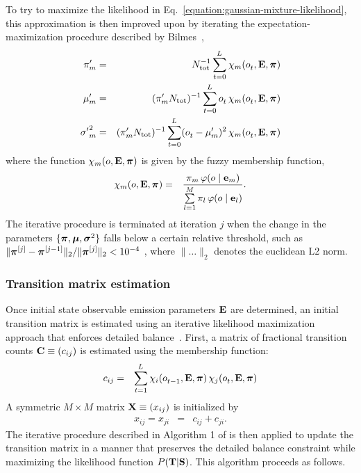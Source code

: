 \documentclass[aps,pre,twocolumn,superscriptaddress,nofootinbib,longbibliography]{revtex4-1}
\newcommand{\bfv}[1]{{\mbox{\boldmath{$#1$}}}}
\newcommand{\bfm}[1]{{\bf #1}}
\begin{document}
{{\color{red} To try to maximize the likelihood in Eq.~\ref{equation:gaussian-mixture-likelihood}, this} approximation is then improved upon by iterating the expectation-maximization procedure described by Bilmes~\cite{bilmes:1998:expectation-maximization},
\begin{eqnarray}
\pi'_m &=& N_\mathrm{tot}^{-1} \sum_{t=0}^{L^{}} \chi_m(o^{}_t, \bfm{E}, \bfv{\pi}) \nonumber \\
\mu'_m &=& (\pi'_m N_\mathrm{tot})^{-1} \sum\limits_{t=0}^{L^{}} o^{}_{t} \, \chi_m(o^{}_{t}, \bfm{E}, \bfv{\pi}) \nonumber \\
{\sigma'}^2_m &=& (\pi'_m N_\mathrm{tot})^{-1} \sum\limits_{t=0}^{L^{}} (o^{}_{t} - \mu'_m)^2 \, \chi_m(o^{}_{t}, \bfm{E}, \bfv{\pi}) 
\end{eqnarray}
where the function $\chi_m(o, \bfm{E}, \bfv{\pi})$ is given by the fuzzy membership function,
\begin{eqnarray}
\chi_m(o, \bfm{E}, \bfv{\pi}) &=& \frac{\pi_m \, \varphi(o \mid \bfm{e}_m)}{\sum\limits_{l=1}^M \pi_l \, \varphi(o \mid \bfm{e}_l)} .
\end{eqnarray}
The iterative procedure is terminated at iteration $j$ when the change in the parameters $\{\bfv{\pi}, \bfv{\mu}, \bfv{\sigma}^2\}$ falls below a certain relative threshold, such as $\|\bfv{\pi}^{[j]} - \bfv{\pi}^{[j-1]}\|_2 / \|\bfv{\pi}^{[j]}\|_2 < 10^{-4}$ {\color{red}, where $\| \ldots \|_2$ denotes the euclidean L2 norm}.

\subsubsection{Transition matrix estimation}

Once initial state observable emission parameters $\bfm{E}$ are determined, an initial transition matrix is estimated using an iterative likelihood maximization approach that enforces detailed balance~\cite{noe:jcp:2011:msm-review}.
First, a matrix of fractional transition counts $\bfm{C} \equiv (c_{ij})$ is estimated using the membership function:
\begin{eqnarray}
c_{ij} &=& \sum_{t=1}^{L^{}} \chi_i(o^{}_{t-1}, \bfm{E}, \bfv{\pi}) \, \chi_j(o^{}_{t}, \bfm{E}, \bfv{\pi})
\end{eqnarray}
A symmetric $M \times M$ matrix $\bfm{X} \equiv (x_{ij})$ is initialized by
\begin{eqnarray}
x_{ij} = x_{ji} &=& c_{ij} + c_{ji} .
\end{eqnarray}
\color{red}
The iterative procedure described in Algorithm 1 of \cite{noe:jcp:2011:msm-review} is then applied to update the transition matrix in a manner that preserves the detailed balance constraint while maximizing the likelihood function $P(\bfm{T} | \bfm{S})$.
This algorithm proceeds as follows.
\color{black}

}
\end{document}
